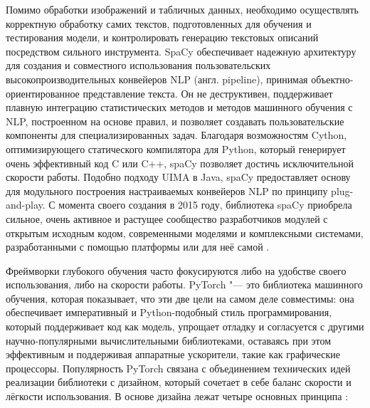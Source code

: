 \documentclass[bachelor, och, coursework]{SCWorks}
\begin{document}
        Помимо обработки изображений и табличных данных, необходимо осуществлять
        корректную обработку самих текстов, подготовленных для обучения и
        тестирования модели, и контролировать генерацию текстовых описаний
        посредством сильного инструмента. SpaCy обеспечивает надежную
        архитектуру для создания и совместного использования пользовательских
        высокопроизводительных конвейеров NLP (англ. pipeline), принимая
        объектно-ориентированное представление текста. Он не деструктивен,
        поддерживает плавную интеграцию статистических методов и методов
        машинного обучения с NLP, построенном на основе правил, и позволяет
        создавать пользовательские компоненты для специализированных задач.
        Благодаря возможностям Cython, оптимизирующего статического компилятора
        для Python, который генерирует очень эффективный код C или C++, spaCy
        позволяет достичь исключительной скорости работы. Подобно подходу UIMA в
        Java, spaCy предоставляет основу для модульного построения настраиваемых
        конвейеров NLP по принципу plug-and-play. С момента своего создания в
        2015 году, библиотека spaCy приобрела сильное, очень активное и растущее
        сообщество разработчиков модулей с открытым исходным кодом, современными
        моделями и комплексными системами, разработанными с помощью платформы
        или для неё самой \cite{spacy}.
        
        Фреймворки глубокого обучения часто фокусируются либо на удобстве своего
        использования, либо на скорости работы. PyTorch "--- это библиотека
        машинного обучения, которая показывает, что эти две цели на самом деле
        совместимы: она обеспечивает императивный и Python-подобный стиль
        программирования, который поддерживает код как модель, упрощает отладку
        и согласуется с другими научно-популярными вычислительными библиотеками,
        оставаясь при этом эффективным и поддерживая аппаратные ускорители,
        такие как графические процессоры. Популярность PyTorch связана с
        объединением технических идей реализации библиотеки с дизайном, который
        сочетает в себе баланс скорости и лёгкости использования. В основе
        дизайна лежат четыре основных принципа \cite{pytorch}:
\end{document}
